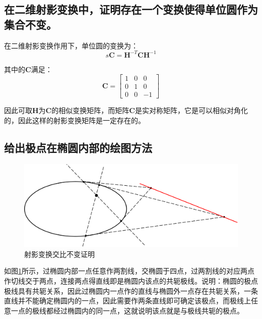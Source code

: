 \documentclass[11pt]{article}
\begin{document}
\subsection{	在二维射影变换中，证明存在一个变换使得单位圆作为集合不变。}
在二维射影变换作用下，单位圆的变换为：
\begin{equation*}
  s\mathbold{C}=\mathbf{H}^{-T}\mathbf{CH}^{-1}
\end{equation*}\par
其中的$\mathbf{C}$满足：
\begin{equation*}
  \mathbf{C}=\begin{bmatrix}
    1 & 0 & 0  \\
    0 & 1 & 0  \\
    0 & 0 & -1
  \end{bmatrix}
\end{equation*}\par
因此可取$\mathbf{H}$为$\mathbf{C}$的相似变换矩阵，而矩阵$\mathbf{C}$是实对称矩阵，它是可以相似对角化的，因此这样的射影变换矩阵是一定存在的。
\subsection{给出极点在椭圆内部的绘图方法}
\begin{figure}[H]
  \centering
  \includegraphics[width=0.5\linewidth]{证明题4.png}
  \caption{射影变换交比不变证明}
  \label{fig:证明题4}
\end{figure}\par
如图\ref{fig:证明题4}所示，过椭圆内部一点任意作两割线，交椭圆于四点，过两割线的对应两点作切线交于两点，连接两点得直线即是椭圆内该点的共轭极线。说明：椭圆的极点极线具有共轭关系，因此过椭圆内一点作的直线与椭圆外一点存在共轭关系，一条直线并不能确定椭圆内的一点，因此需要作两条直线即可确定该极点，而极线上任意一点的极线都经过椭圆内的同一点，这就说明该点就是与极线共轭的极点。
\end{document}
